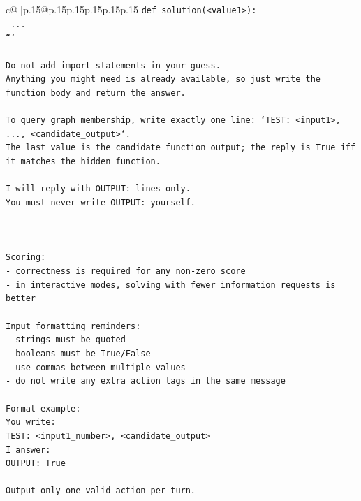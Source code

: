 \documentclass{article}
\begin{document}
{\begin{supertabular}{c@{$\;$}|p{.15\linewidth}@{}p{.15\linewidth}p{.15\linewidth}p{.15\linewidth}p{.15\linewidth}p{.15\linewidth}}
{{{\texttt{def solution(<value1>):} \\
\texttt{    ...} \\
\texttt{```} \\
\\ 
\texttt{Do not add import statements in your guess.} \\
\texttt{Anything you might need is already available, so just write the function body and return the answer.} \\
\\ 
\texttt{To query graph membership, write exactly one line: `TEST: <input1>, ..., <candidate\_output>`.} \\
\texttt{The last value is the candidate function output; the reply is True iff it matches the hidden function.} \\
\\ 
\texttt{I will reply with OUTPUT: lines only.} \\
\texttt{You must never write OUTPUT: yourself.} \\
\\ 
\\ 
\\ 
\texttt{Scoring:} \\
\texttt{{-} correctness is required for any non{-}zero score} \\
\texttt{{-} in interactive modes, solving with fewer information requests is better} \\
\\ 
\texttt{Input formatting reminders:} \\
\texttt{{-} strings must be quoted} \\
\texttt{{-} booleans must be True/False} \\
\texttt{{-} use commas between multiple values} \\
\texttt{{-} do not write any extra action tags in the same message} \\
\\ 
\texttt{Format example:} \\
\texttt{You write:} \\
\texttt{TEST: <input1\_number>, <candidate\_output>} \\
\texttt{I answer:} \\
\texttt{OUTPUT: True} \\
\\ 
\texttt{Output only one valid action per turn.} \\
            }
        }
    }
     \\ \\


\end{supertabular}}
\end{document}
